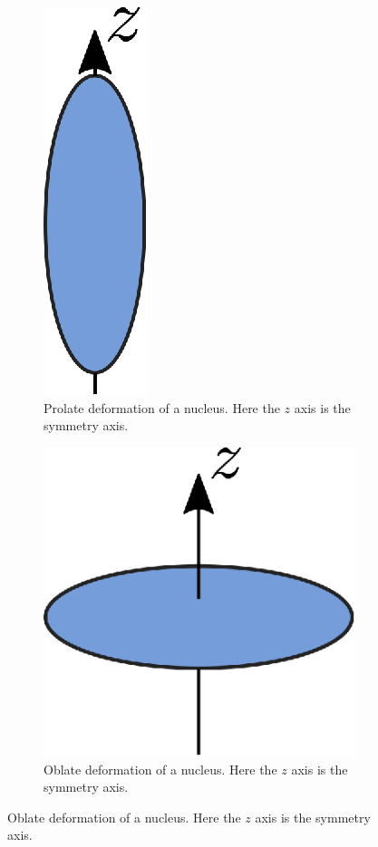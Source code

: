 \documentclass[8pt,a4paper, twoside]{report}
\begin{document}
\begin{figure}
\center
\begin{subfigure}[b]{0.48\textwidth}
\center
\includegraphics{./figures/prolate.eps}
\caption{Prolate deformation of a nucleus. Here the $z$ axis is the symmetry axis.}
\end{subfigure}	
\quad
\begin{subfigure}[b]{0.48\textwidth}
\center
\includegraphics{./figures/oblate.eps}
\caption{Oblate deformation of a nucleus. Here the $z$ axis is the symmetry axis.}
\end{subfigure}
\end{figure}
\end{document}
